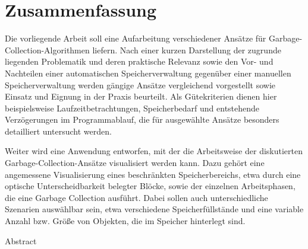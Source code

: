 %
\chapter*{Zusammenfassung}
\label{sec:abstract}
\vspace*{-10mm}

Die vorliegende Arbeit soll eine Aufarbeitung verschiedener Ansätze für Garbage-Collection-Algorithmen liefern.
Nach einer kurzen Darstellung der zugrunde liegenden Problematik und deren praktische Relevanz sowie den Vor- und Nachteilen einer automatischen Speicherverwaltung gegenüber einer manuellen Speicherverwaltung werden gängige Ansätze vergleichend vorgestellt sowie Einsatz und Eignung in der Praxis beurteilt.
Als Gütekriterien dienen hier beispielsweise Laufzeitbetrachtungen, Speicherbedarf und entstehende Verzögerungen im Programmablauf, die für ausgewählte Ansätze besonders detailliert untersucht werden.

Weiter wird eine Anwendung entworfen, mit der die Arbeitsweise der diskutierten Garbage-Collection-Ansätze visualisiert werden kann.
Dazu gehört eine angemessene Visualisierung eines beschränkten Speicherbereichs, etwa durch eine optische Unterscheidbarkeit belegter Blöcke, sowie der einzelnen Arbeitsphasen, die eine Garbage Collection ausführt.
Dabei sollen auch unterschiedliche Szenarien auswählbar sein, etwa verschiedene Speicherfüllstände und eine variable Anzahl bzw. Größe von Objekten, die im Speicher hinterlegt sind.


\vspace*{20mm}

{Abstract}\label{sec:abstract-diff} \\

\blindtext
